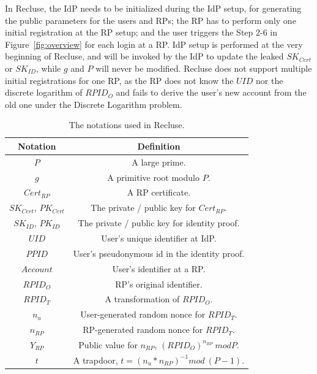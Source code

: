 In Recluse, the IdP needs to be initialized during the IdP setup, for generating the public parameters for the users and RPs; the RP has to perform only one initial registration at the RP setup; and  the user triggers the Step 2-6 in Figure~\ref{fig:overview} for each login at a RP. IdP setup is performed at the very beginning of Recluse, and will be invoked by the IdP to update the leaked $SK_{Cert}$ or $SK_{ID}$, while $g$ and $P$ will never be modified. Recluse does not support multiple initial registrations for one RP, as the RP does not know the $UID$ nor the discrete logarithm of $RPID_O$ and fails to derive the user's new account  from the old one under the Discrete Logarithm problem.


\begin{table}[tb]
    \caption{The notations used in Recluse.}
    \centering
    \begin{tabular}{|c|c|}
    \hline
    {Notation} & {Definition} \\
    \hline
    {$P$} & {A large prime.} \\
    \hline
    {$g$} & {A primitive root  modulo $P$.} \\
    \hline
    {$Cert_{RP}$} & {A RP certificate.} \\
    \hline
    {$SK_{Cert}$, $PK_{Cert}$} & {The private / public key for $Cert_{RP}$.} \\
    \hline
    {$SK_{ID}$, $PK_{ID}$} & {The private / public key for  identity proof.} \\
    \hline
    {$UID$} & {User's unique identifier at IdP.} \\
    \hline
    {$PPID$} & {User's pseudonymous id in the identity proof.} \\
    \hline
    {$Account$} & {User's identifier at a RP.} \\
    \hline
    {$RPID_O$} & {RP's original identifier.} \\
    \hline
    {$RPID_T$} & {A transformation of $RPID_O$.} \\
    \hline
    {$n_u$} & {User-generated random nonce for $RPID_T$. } \\
    \hline
    {$n_{RP}$} & {RP-generated random nonce for $RPID_T$. } \\
    \hline
    {$Y_{RP}$} & {Public value for $n_{RP}$, $(RPID_O)^{n_{RP}} \ mod P$. } \\
    \hline
    {$t$} & {A trapdoor, $t=(n_u*n_{RP})^{-1} mod \ (P-1)$. } \\
    \hline
    \end{tabular}
    \label{tbl:notations}
\end{table}

